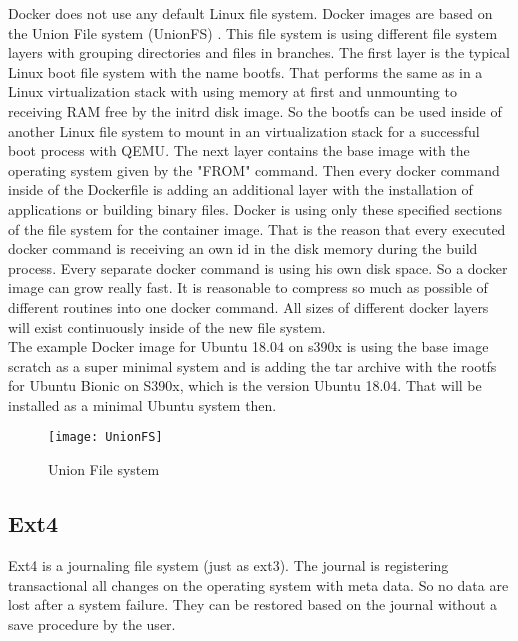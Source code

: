 Docker does not use any default Linux file system. 
Docker images are based on the Union File system (UnionFS) \cite[~p.21]{Ashraf2015}. 
This file system is using different file system layers with grouping directories and files in branches. 
The first layer is the typical Linux boot file system with the name bootfs. 
That performs the same as in a Linux virtualization stack with using memory at first and unmounting to receiving RAM free by the initrd disk image. 
So the bootfs can be used inside of another Linux file system to mount in an virtualization stack for a successful boot process with \gls{QEMU}.
The next layer contains the base image with the operating system given by the "FROM" command.
Then every docker command inside of the Dockerfile is adding an additional layer with the installation of applications or building binary files. 
Docker is using only these specified sections of the file system for the container image.
That is the reason that every executed docker command is receiving an own id in the disk memory during the build process.
Every separate docker command is using his own disk space. So a docker image can grow really fast.
It is reasonable to compress so much as possible of different routines into one docker command. 
All sizes of different docker layers will exist continuously inside of the new file system. \\
The example Docker image for Ubuntu 18.04 on s390x is using the base image scratch as a super minimal system and is adding the tar archive with the rootfs for Ubuntu Bionic on S390x, which is the version Ubuntu 18.04. That will be installed as a minimal Ubuntu system then.

\begin{figure}[H]
\centering
\texttt{[image: UnionFS]}
 \caption{Union File system}
    \label{UnionFilesytem}
\end{figure}

\subsection{Ext4}

Ext4 is a journaling file system (just as ext3). The journal is registering transactional all changes on the operating system with meta data.
So no data  are lost after a system failure. They can be restored based on the journal without a save procedure by the user.

